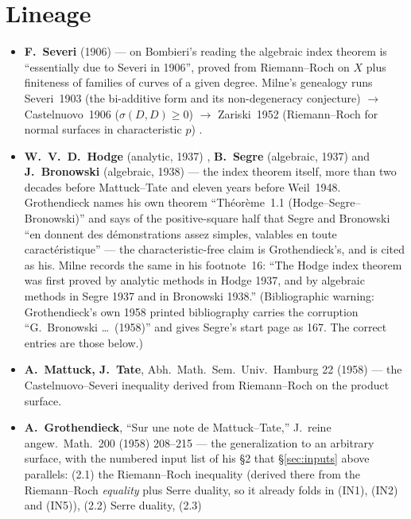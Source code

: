 \documentclass[11pt]{article}
\theoremstyle{definition}
\theoremstyle{remark}
\begin{document}
\section{Lineage}
\label{sec:lineage}

\begin{itemize}
\item \textbf{F.~Severi} (1906) \cite{Severi} --- on Bombieri's reading
  \cite[p.~9]{BombieriRH} the algebraic index theorem is ``essentially due to Severi in 1906'',
  proved from Riemann--Roch on $X$ plus finiteness of families of curves of a given degree.
  Milne's genealogy runs Severi~1903 (the bi-additive form and its non-degeneracy conjecture)
  $\to$ Castelnuovo~1906 ($\sigma(D, D) \ge 0$) $\to$ Zariski~1952 (Riemann--Roch for normal
  surfaces in characteristic $p$) \cite[pp.~12--13]{Milne16}.
\item \textbf{W.~V.~D.~Hodge} (analytic, 1937) \cite{Hodge}, \textbf{B.~Segre} (algebraic,
  1937) \cite{Segre} and \textbf{J.~Bronowski} (algebraic, 1938) \cite{Bronowski} --- the index
  theorem itself, more than two decades before Mattuck--Tate and eleven years before Weil~1948.
  Grothendieck names his own theorem ``Th\'eor\`eme~1.1 (Hodge--Segre--Bronowski)''
  \cite[p.~208]{Grothendieck} and says of the positive-square half that Segre and Bronowski
  ``en donnent des d\'emonstrations assez simples, valables en toute caract\'eristique'' --- the
  characteristic-free claim is Grothendieck's, and is cited as his. Milne records the same in his
  footnote~16: ``The Hodge index theorem was first proved by analytic methods in Hodge 1937, and
  by algebraic methods in Segre 1937 and in Bronowski 1938.'' (Bibliographic warning:
  Grothendieck's own 1958 printed bibliography carries the corruption ``G.~Bronowski \ldots\
  (1958)'' and gives Segre's start page as 167. The correct entries are those below.)
\item \textbf{A.~Mattuck, J.~Tate}, Abh.\ Math.\ Sem.\ Univ.\ Hamburg 22 (1958)
  \cite{MattuckTate} --- the Castelnuovo--Severi inequality derived from Riemann--Roch on
  the product surface.
\item \textbf{A.~Grothendieck}, ``Sur une note de Mattuck--Tate,'' J.\ reine angew.\ Math.\
  200 (1958) 208--215 \cite{Grothendieck} --- the generalization to an arbitrary surface, with
  the numbered input list of his \S2 that \S\ref{sec:inputs} above parallels: (2.1) the
  Riemann--Roch inequality (derived there from the Riemann--Roch \emph{equality} plus Serre
  duality, so it already folds in (IN1), (IN2) and (IN5)), (2.2) Serre duality, (2.3)

\end{itemize}
\end{document}
